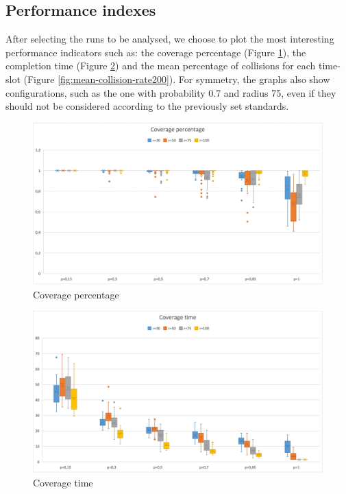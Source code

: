 \fi

\subsection{Performance indexes} \label{200Index}
After selecting the runs to be analysed, we choose to plot the most interesting performance indicators such as: the coverage percentage (Figure \ref{fig:coverage-percentage}), the completion time (Figure \ref{fig:coverage-time200}) and the mean percentage of collisions for each time-slot (Figure \ref{fig:mean-collision-rate200}). For symmetry, the graphs also show configurations, such as the one with probability 0.7 and radius 75, even if they  should not be considered according to the previously  set standards.

\begin{figure}[h!]
\centering
    \includegraphics[width= 1\textwidth]{./images/Rate200Boxplot.png}
    \caption{Coverage percentage}
    \label{fig:coverage-percentage}
\end{figure}


\begin{figure}[h!]
\centering
    \includegraphics[width= 1\textwidth]{./images/Time200Boxplot.png}
    \caption{Coverage time}
    \label{fig:coverage-time200}
\end{figure}

